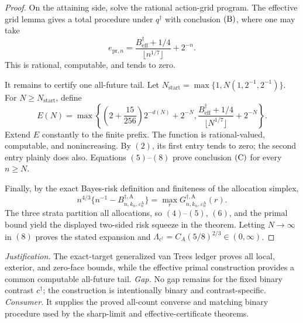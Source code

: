 \documentclass{article}
\begin{document}
\begin{proof}
On the attaining side, solve the rational action-grid program.  The effective grid lemma gives a total procedure under \(q^\dagger\) with conclusion \({\rm(B)}\), where one may take
\[
e_{\mathrm{pr},n}=
\frac{B_{\mathrm{eff}}^\dagger+1/4}{\lfloor n^{1/7}\rfloor}+2^{-n}.
\tag{7}
\]
This is rational, computable, and tends to zero.

It remains to certify one all-future tail.  Let
\(N_{\mathrm{start}}=\max\{1,N(1,2^{-1},2^{-1})\}\).  For
\(N\ge N_{\mathrm{start}}\), define
\[
E(N)=\max\left\{
\left(2+\frac{15}{256}\right)2^{-d(N)}+2^{-N},
\frac{B_{\mathrm{eff}}^\dagger+1/4}{\lfloor N^{1/7}\rfloor}+2^{-N}
\right\}.
\tag{8}
\]
Extend \(E\) constantly to the finite prefix.  The function is rational-valued, computable, and nonincreasing.  By \((2)\), its first entry tends to zero; the second entry plainly does also.  Equations \((5)\)--\((8)\) prove conclusion \({\rm(C)}\) for every \(n\ge N\).

Finally, by the exact Bayes-risk definition and finiteness of the allocation simplex,
\[
n^{4/3}\{n^{-1}-B_{n,k_n,\varepsilon_n^{\mathrm A}}^{\dagger,\mathrm A}\}
=\max_rG_{n,k_n,\varepsilon_n^{\mathrm A}}^{\dagger,\mathrm A}(r).
\tag{9}
\]
The three strata partition all allocations, so \((4)\)--\((5)\), \((6)\), and the primal bound yield the displayed two-sided risk squeeze in the theorem.  Letting \(N\to\infty\) in \((8)\) proves the stated expansion and
\(\Lambda_{c^\dagger}=C_A(5/8)^{2/3}\in(0,\infty)\).
\end{proof}
\par\smallskip\noindent \textit{Justification.} The exact-target generalized van Trees ledger proves all local, exterior, and zero-face bounds, while the effective primal construction provides a common computable all-future tail. \textit{Gap.} No gap remains for the fixed binary contrast \(c^\dagger\); the construction is intentionally binary and contrast-specific. \textit{Consumer.} It supplies the proved all-count converse and matching binary procedure used by the sharp-limit and effective-certificate theorems.
\end{document}
